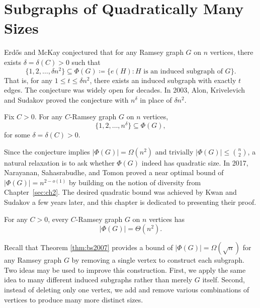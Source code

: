 \section{Subgraphs of Quadratically Many Sizes}
\label{sec:ch3}

Erd\H{o}s and McKay conjectured that for any Ramsey graph $G$ on $n$ vertices, there exists $\delta = \delta(C) > 0$ such that
\[
  \bigl\{1, 2, \ldots, \delta n^2\bigr\} \subseteq \Phi(G) \coloneqq \bigl\{e(H) : H \text{ is an induced subgraph of } G\bigr\}.
\]
That is, for any $1 \leq t \leq \delta n^2$, there exists an induced subgraph with exactly $t$ edges. The conjecture was widely open for decades. In 2003, Alon, Krivelevich and Sudakov \cite{AlonKrivelevichSudakov2003} proved the conjecture with $n^{\delta}$ in place of $\delta n^2$.
\begin{theorem}
  \label{thm:alks2003}
  Fix $C > 0$. For any $C$-Ramsey graph $G$ on $n$ vertices,
  \[
  \bigl\{1, 2, \ldots, n^{\delta}\bigr\} \subseteq \Phi(G),
  \]
  for some $\delta = \delta(C) > 0$.
\end{theorem}
Since the conjecture implies $|\Phi(G)| = \Omega(n^2)$ and trivially $|\Phi(G)| \leq \binom{n}{2}$, a natural relaxation is to ask whether $\Phi(G)$ indeed has quadratic size. In 2017, Narayanan, Sahasrabudhe, and Tomon \cite{narayanan2017ramseygraphsinducesubgraphs} proved a near optimal bound of $|\Phi(G)| = n^{2 - o(1)}$ by building on the notion of diversity from Chapter~\ref{sec:ch2}. The desired quadratic bound was achieved by Kwan and Sudakov \cite{kwan2021ramseygraphsinducesubgraphs} a few years later, and this chapter is dedicated to presenting their proof.

\begin{theorem}
  \label{thm:ks}
  For any $C > 0$, every $C$-Ramsey graph $G$ on $n$ vertices has
  \[
    |\Phi(G)| = \Theta(n^2).
  \]
\end{theorem}

Recall that Theorem \ref{thm:bs2007} provides a bound of $|\Phi(G)| = \Omega(\sqrt{n})$ for any Ramsey graph $G$ by removing a single vertex to construct each subgraph. Two ideas may be used to improve this construction. First, we apply the same idea to many different induced subgraphs rather than merely $G$ itself. Second, instead of deleting only one vertex, we add and remove various combinations of vertices to produce many more distinct sizes. 

